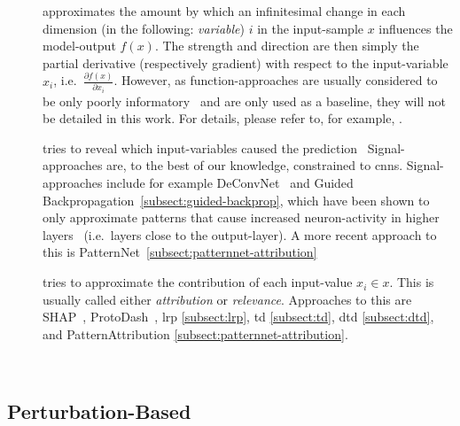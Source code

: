 \begin{description}
    \item[] approximates the amount by which an infinitesimal change in each dimension (in the following: \textit{variable}) \(i\) in the input-sample \(x\) influences the model-output \(f(x)\). The strength and direction are then simply the partial derivative (respectively gradient) with respect to the input-variable \(x_i\), i.e.\ \(\frac{\partial f(x)}{\partial x_i}\). However, as function-approaches are usually considered to be only poorly informatory~\cite{Kindermans.2018} and are only used as a baseline, they will not be detailed in this work. For details, please refer to, for example, .
    \item[] tries to reveal which input-variables caused the prediction~\cite{Kindermans.2018,Zeiler.2014} Signal-approaches are, to the best of our knowledge, constrained to \glspl{cnn}. Signal-approaches include for example DeConvNet~\cite{Zeiler.2014} and Guided Backpropagation~\cref{subsect:guided-backprop}, which have been shown to only approximate patterns that cause increased neuron-activity in higher layers~\cite{Kindermans.2019} (i.e.\ layers close to the output-layer). A more recent approach to this is PatternNet~\cref{subsect:patternnet-attribution}
    \item[] tries to approximate the contribution of each input-value \(x_i\in x\). This is usually called either \textit{attribution} or \textit{relevance}. Approaches to this are SHAP~\cite{Lundberg.2017}, ProtoDash~\cite{Gurumoorthy.2017}, \gls{lrp} \cref{subsect:lrp}, \gls{td} \cref{subsect:td}, \gls{dtd} \cref{subsect:dtd}, and PatternAttribution \cref{subsect:patternnet-attribution}.
\end{description}~\cite{Kindermans.2018,Kindermans.2019}

\subsection{Perturbation-Based}
\blindtext[1]
